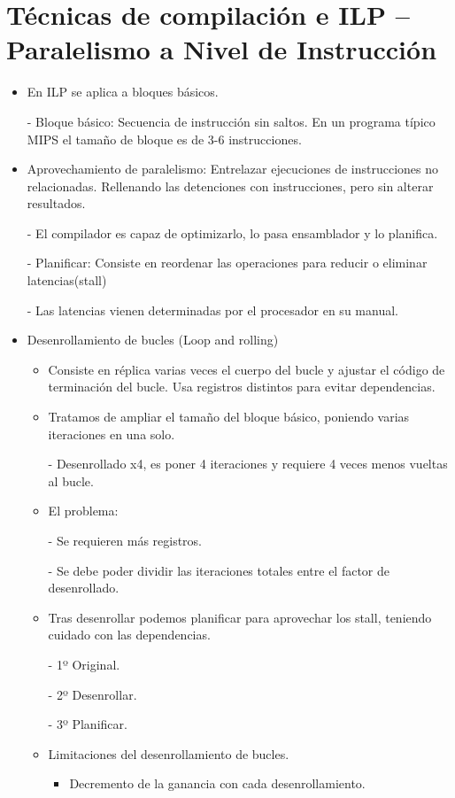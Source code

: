 \documentclass[12pt, twoside, openright]{report} %
\begin{document}
\section{Técnicas de compilación e ILP -- Paralelismo a Nivel de
Instrucción}

\begin{itemize}
\item En ILP se aplica a bloques básicos.
    
    - Bloque básico: Secuencia de instrucción sin saltos. En un programa típico MIPS el tamaño de bloque es de 3-6 instrucciones.
\item Aprovechamiento de paralelismo: Entrelazar ejecuciones de instrucciones no relacionadas. Rellenando las detenciones con instrucciones, pero sin alterar resultados.
   
    - El compilador es capaz de optimizarlo, lo pasa ensamblador y lo planifica.
    
    - Planificar: Consiste en reordenar las operaciones para reducir o eliminar latencias(stall)
    
    - Las latencias vienen determinadas por el procesador en su manual.
\item Desenrollamiento de bucles (Loop and rolling)
\begin{itemize}
  \item Consiste en réplica varias veces el cuerpo del bucle y ajustar el código de terminación del bucle. Usa registros distintos para evitar dependencias.
  \item Tratamos de ampliar el tamaño del bloque básico, poniendo varias iteraciones en una solo.
  
      - Desenrollado x4, es poner 4 iteraciones y requiere 4 veces menos vueltas al bucle.
  \item El problema:
  
      - Se requieren más registros.

      - Se debe poder dividir las iteraciones totales entre el factor de desenrollado.
  \item Tras desenrollar podemos planificar para aprovechar los stall, teniendo cuidado con las dependencias.
  
      - 1º Original.

      - 2º Desenrollar.

      - 3º Planificar.
  \item Limitaciones del desenrollamiento de bucles.
  \begin{itemize}
    \item Decremento de la ganancia con cada desenrollamiento.
    

\end{itemize}
\end{itemize}
\end{itemize}
\end{document}

